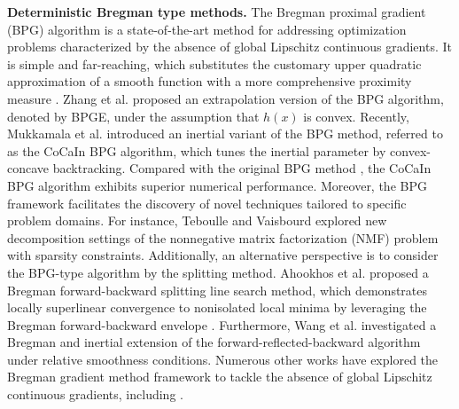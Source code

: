 \documentclass[letterpaper]{article} %
\begin{document}
	\textbf{Deterministic Bregman type methods.} The Bregman proximal gradient (BPG) algorithm \cite{BolteSTV18First} is a state-of-the-art method for addressing optimization problems characterized by the absence of global  Lipschitz continuous gradients. It is simple and far-reaching, 
	which substitutes the customary upper quadratic approximation of a smooth function with a more comprehensive proximity measure \cite{BauschkeBT17}.  Zhang et al. \cite{ZhangBM0C19} proposed an extrapolation version of the BPG algorithm, denoted by BPGE, under the assumption that  $h(x)$ is convex. Recently, Mukkamala et al. \cite{MukkamalaOPS20} introduced an inertial variant of the BPG method, referred to as the CoCaIn BPG algorithm, which tunes the inertial parameter by convex-concave backtracking.
	Compared with the original BPG method \cite{BolteSTV18First}, the CoCaIn BPG algorithm exhibits superior numerical performance. 
	Moreover, the BPG framework facilitates the discovery of novel techniques tailored to specific problem domains. For instance,  Teboulle and Vaisbourd \cite{TeboulleV20} explored new decomposition settings of the nonnegative matrix factorization (NMF) problem with sparsity constraints. Additionally, an alternative perspective is to consider the BPG-type algorithm by the splitting method. Ahookhos et al. \cite{AhookhoshTP21} proposed a Bregman forward-backward splitting line search method, which demonstrates locally superlinear convergence to nonisolated local minima by leveraging the Bregman forward-backward envelope \cite{BauschkeDL18, LaudeOC20}. Furthermore, Wang et al. \cite{WangTOW22} investigated a Bregman and inertial extension of the forward-reflected-backward algorithm \cite{MalitskyT20} under relative smoothness conditions. %
	Numerous other works have explored the Bregman gradient method framework to tackle the absence of global  Lipschitz continuous gradients, including  \cite{ReemRP19, ZhaoDRW22, ZhuDLZ21, DragomirTdB22}.
	
	
	
\end{document}
